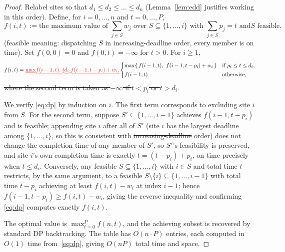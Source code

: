 \documentclass[pdflatex,sn-mathphys-ay]{sn-jnl}
\theoremstyle{thmstyleone}
\theoremstyle{thmstyletwo}
\theoremstyle{thmstylethree}
\providecommand{\DIFadd}[1]{{\protect\color{blue}\uwave{#1}}} %
\providecommand{\DIFdel}[1]{{\protect\color{red}\sout{#1}}}                      %
\providecommand{\DIFaddbegin}{} %
\providecommand{\DIFaddend}{} %
\providecommand{\DIFdelbegin}{} %
\providecommand{\DIFdelend}{} %
\newcommand{\DIFscaledelfig}{0.5}
\newlength{\DIFdelgraphicswidth} %
\newlength{\DIFdelgraphicsheight} %
\newcommand{\DIFaddincludegraphics}[2][]{{\color{blue}\fbox{\DIFOincludegraphics[#1]{#2}}}} %
\newcommand{\DIFdelincludegraphics}[2][]{%
\sbox{\DIFdelgraphicsbox}{\DIFOincludegraphics[#1]{#2}}%
\settoboxwidth{\DIFdelgraphicswidth}{\DIFdelgraphicsbox} %
\settoboxtotalheight{\DIFdelgraphicsheight}{\DIFdelgraphicsbox} %
\scalebox{\DIFscaledelfig}{%
\parbox[b]{\DIFdelgraphicswidth}{\usebox{\DIFdelgraphicsbox}\\[-\baselineskip] \rule{\DIFdelgraphicswidth}{0em}}\llap{\resizebox{\DIFdelgraphicswidth}{\DIFdelgraphicsheight}{%
\setlength{\unitlength}{\DIFdelgraphicswidth}%
\begin{picture}(1,1)%
\thicklines\linethickness{2pt} %
{\color[rgb]{1,0,0}\put(0,0){\framebox(1,1){}}}%
{\color[rgb]{1,0,0}\put(0,0){\line( 1,1){1}}}%
{\color[rgb]{1,0,0}\put(0,1){\line(1,-1){1}}}%
\end{picture}%
}\hspace*{3pt}}} %
} %
\DeclareRobustCommand{\DIFaddbegin}{\DIFOaddbegin \let\includegraphics\DIFaddincludegraphics} %
\DeclareRobustCommand{\DIFaddend}{\DIFOaddend \let\includegraphics\DIFOincludegraphics} %
\DeclareRobustCommand{\DIFdelbegin}{\DIFOdelbegin \let\includegraphics\DIFdelincludegraphics} %
\DeclareRobustCommand{\DIFdelend}{\DIFOaddend \let\includegraphics\DIFOincludegraphics} %
\begin{document}
\begin{proof}
Relabel sites so that $d_1 \le d_2 \le \dots \le d_n$ (Lemma~\ref{lem:edd}
justifies working in this order). Define, for $i = 0,\dots,n$ and $t =
0,\dots,P$,
\[
f(i,t) := \text{the maximum value of } \sum_{j \in S} w_j \text{ over }
S \subseteq \{1,\dots,i\} \text{ with } \sum_{j\in S} p_j = t \text{ and
$S$ feasible.}
\]
(feasible meaning: dispatching $S$ in increasing-deadline order, every
member is on time). Set $f(0,0) = 0$ and $f(0,t) = -\infty$ for $t > 0$.
For $i \ge 1$,
\begin{equation}\label{eq:dp}
f(i,t)=\DIFdelbegin \DIFdel{\max}%
\DIFdel{f(i-1,t),\ }%
\DIFdel{t }%
\DIFdel{d_i}%
\DIFdel{\cdot}%
\DIFdel{f(i-1,t-p_i)
+ w_i}%
\DIFdel{,
}\DIFdelend \DIFaddbegin \begin{cases}
\max\{\,f(i-1,t),\ f(i-1,t-p_i)+w_i\,\} & \text{if } p_i\le t\le d_i,\\[2pt]
f(i-1,t) & \text{otherwise,}
\end{cases}
\DIFaddend \end{equation}
\DIFdelbegin \DIFdel{where the second term is taken as $-\infty$ if $t < p_i$ or $t > d_i$}\DIFdelend \DIFaddbegin \DIFadd{with the convention $-\infty+w_i=-\infty$}\DIFaddend .

We verify \eqref{eq:dp} by induction on $i$. The first term corresponds
to excluding site $i$ from $S$. For the second term, suppose $S'
\subseteq \{1,\dots,i-1\}$ achieves $f(i-1, t-p_i)$ and is feasible;
appending site $i$ after all of $S'$ (site $i$ has the largest deadline
among $\{1,\dots,i\}$, so this is consistent with \DIFdelbegin \DIFdel{increasing-deadline
}\DIFdelend \DIFaddbegin \DIFadd{deadline
}\DIFaddend order) does not change the completion time of any member of $S'$, so
$S'$'s feasibility is preserved, and site $i$'s own completion time is
exactly $t = (t - p_i) + p_i$, on time precisely when $t \le d_i$.
Conversely, any feasible $S \subseteq \{1,\dots,i\}$ with $i \in S$ and
total time $t$ restricts, by the same argument, to a feasible $S
\setminus \{i\} \subseteq \{1,\dots,i-1\}$ with total time $t - p_i$
achieving at least $f(i,t) - w_i$ at index $i-1$; hence $f(i-1,t-p_i)
\ge f(i,t) - w_i$, giving the reverse inequality and confirming
\eqref{eq:dp} computes exactly $f(i,t)$.

The optimal value is $\max_{t=0}^{P} f(n,t)$, and the achieving subset
is recovered by standard DP backtracking. The table has $O(n\cdot P)$
entries, each computed in $O(1)$ time from~\eqref{eq:dp}, giving
$O(nP)$ total time and space.
\end{proof}
\end{document}
